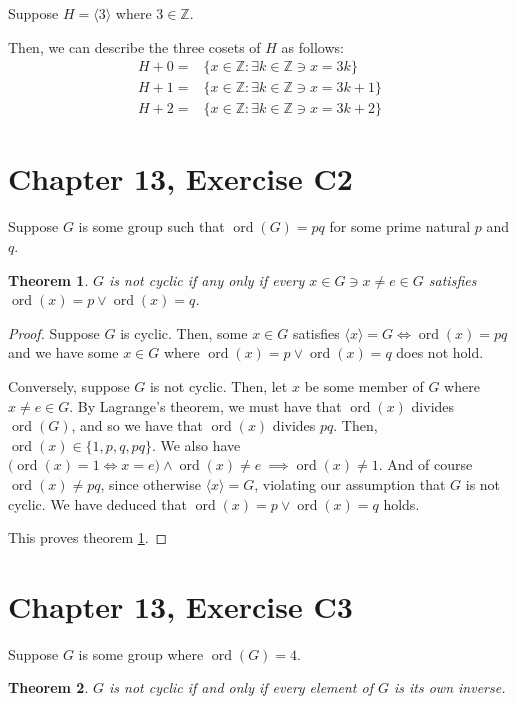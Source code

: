 \documentclass[12pt]{article}
\newcommand{\ints}{\mathbb{Z}}
\newcommand{\ord}{\operatorname{ord}}
\newtheorem{thm}{Theorem}
\begin{document}
Suppose $H = \langle 3 \rangle$
where $3 \in \ints$.

Then, we can describe the three cosets of $H$ as follows:
\begin{align*}
	H + 0 = & \{x \in \ints:\exists k \in \ints \ni x = 3k \} \\
	H + 1 = & \{x \in \ints:\exists k \in \ints \ni x = 3k + 1\} \\
	H + 2 = & \{x \in \ints:\exists k \in \ints \ni x = 3k + 2\}
\end{align*}

\section{Chapter 13, Exercise C2}

Suppose $G$ is some group
such that $\ord(G) = pq$
for some prime natural $p$ and $q$.

\begin{thm} \label{thm1}
	$G$ is not cyclic if any only if every $x \in G \ni x \neq e \in G$
	satisfies $\ord(x) = p \lor \ord(x) = q$.
\end{thm}

\begin{proof}
	Suppose $G$ is cyclic.
	Then, some $x \in G$
	satisfies $\langle x \rangle = G \iff \ord(x) = pq$
	and we have some $x \in G$
	where $\ord(x) = p \lor \ord(x) = q$
	does not hold.

	Conversely,
	suppose $G$ is not cyclic.
	Then, let $x$ be some member of $G$
	where $x \neq e \in G$.
	By Lagrange's theorem,
	we must have that $\ord(x)$ divides $\ord(G)$,
	and so we have that $\ord(x)$ divides $pq$.
	Then, $\ord(x) \in \{1, p, q, pq\}$.
	We also have $\big(\ord(x) = 1 \iff x = e\big) \land \ord(x) \neq e\ \implies \ord(x) \neq 1$.
	And of course $\ord(x) \neq pq$,
	since otherwise $\langle x \rangle = G$,
	violating our assumption that $G$ is not cyclic.
	We have deduced that $\ord(x) = p \lor \ord(x) = q$ holds.

	This proves theorem \ref{thm1}.
\end{proof}

\section{Chapter 13, Exercise C3}

Suppose $G$ is some group
where $\ord(G) = 4$.

\begin{thm} \label{thm2}
	$G$ is not cyclic if and only if every element of $G$ is its own inverse.
\end{thm}
\end{document}
